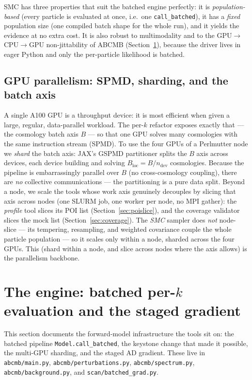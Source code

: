 \documentclass[11pt]{article}
\newcommand{\code}[1]{\texttt{\small #1}}
\newcommand{\file}[1]{\texttt{\small #1}}
\newcommand{\Bloc}{B_{\mathrm{loc}}}
\begin{document}
SMC has three properties that suit the batched engine perfectly: it is
\emph{population-based} (every particle is evaluated at once, i.e.\ one
\code{call\_batched}), it has a \emph{fixed} population size (one compiled
batch shape for the whole run), and it yields the evidence at no extra
cost. It is also robust to multimodality and to the GPU$\to$CPU$\to$GPU
non-jittability of \textsc{ABCMB} (Section~\ref{sec:engine}), because the
driver lives in eager Python and only the per-particle likelihood is
batched.

\subsection{GPU parallelism: SPMD, sharding, and the batch axis}
\label{sec:spmd}

A single A100 GPU is a throughput device: it is most efficient when given
a large, regular, data-parallel workload. The per-$k$ refactor exposes
exactly that --- the cosmology batch axis $B$ --- so that one GPU solves
many cosmologies with the same instruction stream (SPMD). To use the four
GPUs of a Perlmutter node we \emph{shard} the batch axis: JAX's GSPMD
partitioner splits the $B$ axis across devices, each device building and
solving $\Bloc=B/n_{\mathrm{dev}}$ cosmologies. Because the pipeline is
embarrassingly parallel over $B$ (no cross-cosmology coupling), there are
\emph{no} collective communications --- the partitioning is a pure data
split. Beyond a node, we scale the tools whose work axis genuinely
decouples by slicing that axis across nodes (one SLURM job, one worker per
node, no MPI gather): the \emph{profile} tool slices its POI list
(Section~\ref{sec:poislice}), and the coverage validator slices
the mock list (Section~\ref{sec:coverage}). The \emph{SMC} sampler does
\emph{not} node-slice --- its tempering, resampling, and weighted
covariance couple the whole particle population --- so it scales only
within a node, sharded across the four GPUs. This (shard within a node,
and slice across nodes where the axis allows) is the parallelism backbone.

\section{The engine: batched per-$k$ evaluation and the staged gradient}
\label{sec:engine}

This section documents the forward-model infrastructure the tools sit on:
the batched pipeline \code{Model.call\_batched}, the keystone change that
made it possible, the multi-GPU sharding, and the staged AD gradient.
These live in \file{abcmb/main.py}, \file{abcmb/perturbations.py},
\file{abcmb/spectrum.py}, \file{abcmb/background.py}, and
\file{scan/batched\_grad.py}.
\end{document}
